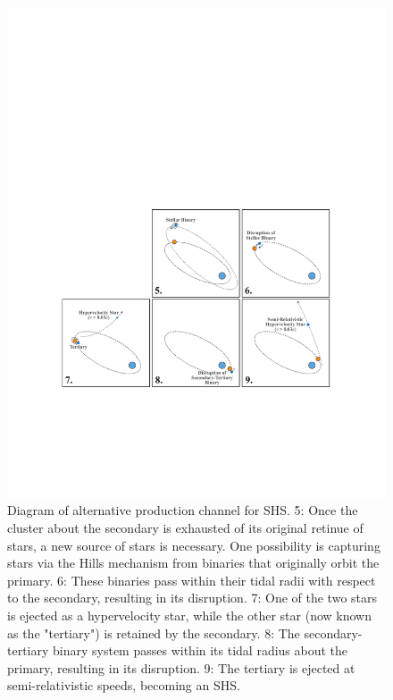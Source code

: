 \documentclass[a4paper,twocolumn]{emulateapj}
\begin{document}
\begin{figure}
\centering\includegraphics[width=\linewidth,clip=true]{shs-diagram2}
\caption{Diagram of alternative production channel for SHS. 5: Once the cluster about the secondary is exhausted of its original retinue of stars, a new source of stars is necessary. One possibility is capturing stars via the Hills mechanism from binaries that originally orbit the primary. 6: These binaries pass within their tidal radii with respect to the secondary, resulting in its disruption. 7: One of the two stars is ejected as a hypervelocity star, while the other star (now known as the "tertiary") is retained by the secondary. 8: The secondary-tertiary binary system passes within its tidal radius about the primary, resulting in its disruption. 9: The tertiary is ejected at semi-relativistic speeds, becoming an SHS.}
\label{fig:diagram2}
\end{figure}
\end{document}
